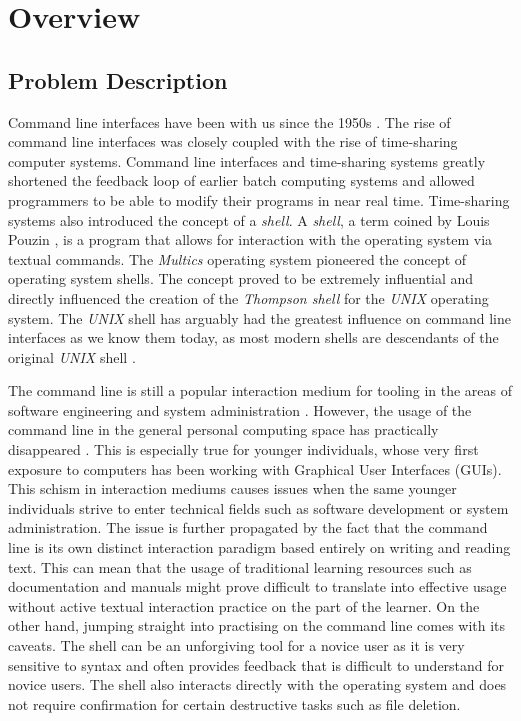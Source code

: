 \chapter{Overview}
\label{chap:overview}
\section{Problem Description}

Command line interfaces have been with us since the 1950s
\cite{raymond2004art}. The rise of command line interfaces was closely coupled
with the rise of time-sharing computer systems. Command line interfaces and
time-sharing systems greatly shortened the feedback loop of earlier batch
computing systems and allowed programmers to be able to modify their programs
in near real time. Time-sharing systems also introduced the concept of a
\textit{shell}. A \textit{shell}, a term coined by Louis Pouzin \cite{pouzin},
is a program that allows for interaction with the operating system via textual
commands. The \textit{Multics}\cite{corbato1965introduction} operating system
pioneered the concept of operating system shells. The concept proved to be
extremely influential and directly influenced the creation of the
\textit{Thompson shell} for the \textit{UNIX} \cite{ritchie1974unix} operating
system. The \textit{UNIX} shell has arguably had the greatest influence on
command line interfaces as we know them today, as most modern shells are
descendants of the original \textit{UNIX} shell \cite{raymond2004art}.

The command line is still a popular interaction medium for tooling in the areas
of software engineering and system administration
\cite{hultstrand2015git,takayama2006trust}. However, the usage of the command
line in the general personal computing space has practically disappeared
\cite{reimer2005history}. This is especially true for younger individuals,
whose very first exposure to computers has been working with Graphical User
Interfaces (GUIs). This schism in interaction mediums causes issues when the
same younger individuals strive to enter technical fields such as software
development or system administration. The issue is further propagated by the
fact that the command line is its own distinct interaction paradigm based
entirely on writing and reading text. This can mean that the usage of
traditional learning resources such as documentation and manuals might prove
difficult to translate into effective usage without active textual interaction
practice on the part of the learner. On the other hand, jumping straight into
practising on the command line comes with its caveats. The shell can be an
unforgiving tool for a novice user as it is very sensitive to syntax and often
provides feedback that is difficult to understand for novice users. The shell
also interacts directly with the operating system and does not require
confirmation for certain destructive tasks such as file deletion.

